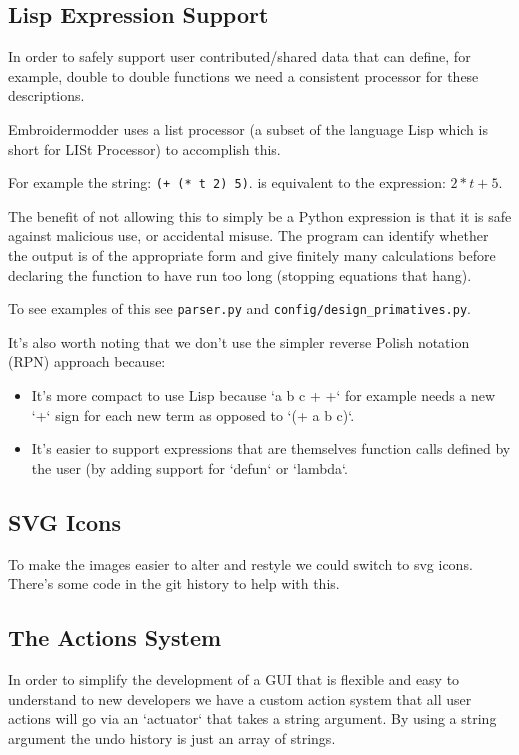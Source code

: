 \documentclass[10pt]{report}
\begin{document}
\subsection{Lisp Expression Support}

In order to safely support user contributed/shared data that can
define, for example, double to double functions we need a consistent
processor for these descriptions.

Embroidermodder uses a list processor (a subset of the language
Lisp which is short for LISt Processor) to accomplish this.

For example the string: \texttt{(+ (* t 2) 5)}.
is equivalent to the expression: $2*t + 5$.

The benefit of not allowing this to simply be a Python expression
is that it is safe against malicious use, or accidental misuse.
The program can identify whether the output is of the appropriate
form and give finitely many calculations before declaring the
function to have run too long (stopping equations that hang).

To see examples of this see \texttt{parser.py} and
\texttt{config/design\_primatives.py}.

It's also worth noting that we don't use the simpler reverse Polish
notation (RPN) approach because:

\begin{itemize}
\item It's more compact to use Lisp because `a b c + +` for example needs a new `+` sign for each new term as opposed to `(+ a b c)`.
\item It's easier to support expressions that are themselves function calls defined by the user (by adding support for `defun` or `lambda`.
\end{itemize}

\subsection{SVG Icons}

To make the images easier to alter and restyle we could
switch to svg icons. There's some code in the git history
to help with this.

\subsection{The Actions System}

In order to simplify the development of a GUI that is flexible and
easy to understand to new developers we have a custom action system that all
user actions will go via an `actuator` that takes a string argument. By using a
string argument the undo history is just an array of strings.
\end{document}
